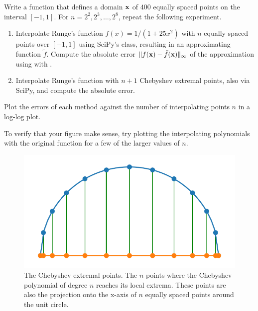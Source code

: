 \begin{problem} %
Write a function that defines a domain $\mathbf{x}$ of $400$ equally spaced points on the interval $[-1, 1]$.
For $n=2^2,2^3,\ldots,2^8$, repeat the following experiment.
\begin{enumerate}
    \item Interpolate Runge's function $f(x) = 1/(1+25x^2)$ with $n$ equally spaced points over $[-1,1]$ using SciPy's  class, resulting in an approximating function $\tilde{f}$.
    Compute the absolute error $\|f(\mathbf{x}) - \tilde{f}(\mathbf{x})\|_\infty$ of the approximation using  with .
    \item Interpolate Runge's function with $n+1$ Chebyshev extremal points, also via SciPy, and compute the absolute error.
\end{enumerate}
Plot the errors of each method against the number of interpolating points $n$ in a log-log plot.

To verify that your figure make sense, try plotting the interpolating polynomials with the original function for a few of the larger values of $n$.
\end{problem}

\begin{figure}[H]
\centering
\includegraphics{figures/extrema.pdf}
\caption{The Chebyshev extremal points.  The $n$ points where the Chebyshev polynomial of degree $n$ reaches its local extrema.
These points are also the projection onto the x-axis of $n$ equally spaced points around the unit circle.}
\label{fig:extrema}
\end{figure}

